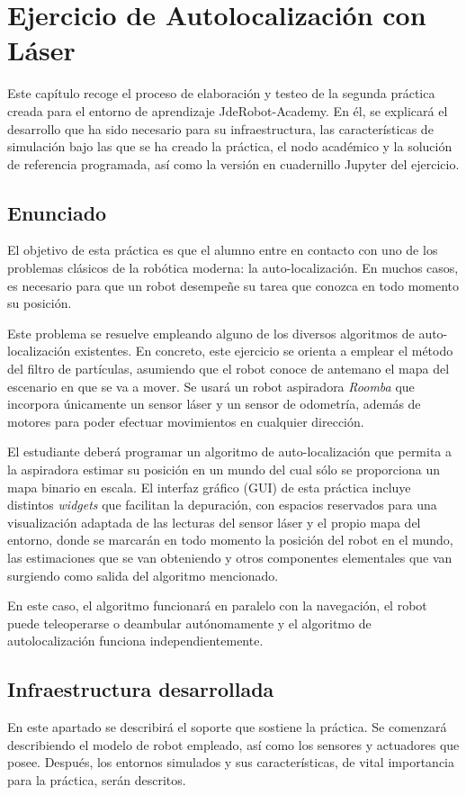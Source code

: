 \chapter{Ejercicio de Autolocalización con Láser}\label{cap.laserloc}
Este capítulo recoge el proceso de elaboración y testeo de la segunda práctica creada para el entorno de aprendizaje JdeRobot-Academy. En él, se explicará el desarrollo que ha sido necesario para su infraestructura, las características de simulación bajo las que se ha creado la práctica, el nodo académico y la solución de referencia programada, así como la versión en cuadernillo Jupyter del ejercicio.

\section{Enunciado} \label{sec.enunciado}
El objetivo de esta práctica es que el alumno entre en contacto con uno de los problemas clásicos de la robótica moderna: la auto-localización. En muchos casos, es necesario para que un robot desempeñe su tarea que conozca en todo momento su posición.

Este problema se resuelve empleando alguno de los diversos algoritmos de auto-localización existentes. En concreto, este ejercicio se orienta a emplear el método del filtro de partículas, asumiendo que el robot conoce de antemano el mapa del escenario en que se va a mover. Se usará un robot aspiradora \textit{Roomba} que incorpora únicamente un sensor láser y un sensor de odometría, además de motores para poder efectuar movimientos en cualquier dirección. 

El estudiante deberá programar un algoritmo de auto-localización que permita a la aspiradora estimar su posición en un mundo del cual sólo se proporciona un mapa binario en escala. El interfaz gráfico (GUI) de esta práctica incluye distintos \textit{widgets} que facilitan la depuración, con espacios reservados para una visualización adaptada de las lecturas del sensor láser y el propio mapa del entorno, donde se marcarán en todo momento la posición del robot en el mundo, las estimaciones que se van obteniendo y otros componentes elementales que van surgiendo como salida del algoritmo mencionado. 

En este caso, el algoritmo funcionará en paralelo con la navegación, el robot puede teleoperarse o deambular autónomamente y el algoritmo de autolocalización funciona independientemente.

\section{Infraestructura desarrollada}
En este apartado se describirá el soporte que sostiene la práctica. Se comenzará describiendo el modelo de robot empleado, así como los sensores y actuadores que posee. Después, los entornos simulados y sus características, de vital importancia para la práctica, serán descritos.

